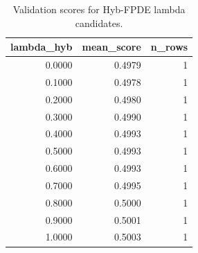 \begin{table}[t]
\caption{Validation scores for Hyb-FPDE lambda candidates.}
\label{tab:lambda_distribution_computed}
\centering
\begin{tabular}{rrr}
\toprule
lambda\_hyb & mean\_score & n\_rows \\
\midrule
0.0000 & 0.4979 & 1 \\
0.1000 & 0.4978 & 1 \\
0.2000 & 0.4980 & 1 \\
0.3000 & 0.4990 & 1 \\
0.4000 & 0.4993 & 1 \\
0.5000 & 0.4993 & 1 \\
0.6000 & 0.4993 & 1 \\
0.7000 & 0.4995 & 1 \\
0.8000 & 0.5000 & 1 \\
0.9000 & 0.5001 & 1 \\
1.0000 & 0.5003 & 1 \\
\bottomrule
\end{tabular}

\end{table}

